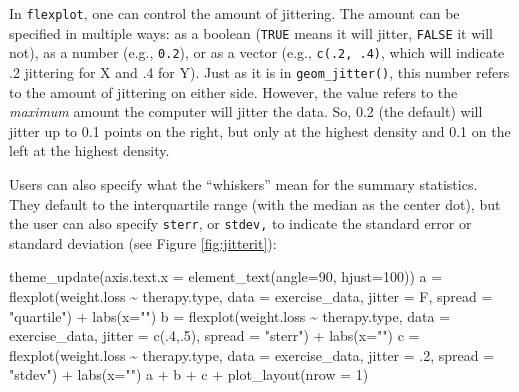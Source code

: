 \documentclass[
  english,
  man]{apa6}
\newenvironment{Shaded}{\begin{snugshade}}{\end{snugshade}}
\newcommand{\AttributeTok}[1]{\textcolor[rgb]{0.77,0.63,0.00}{#1}}
\newcommand{\DecValTok}[1]{\textcolor[rgb]{0.00,0.00,0.81}{#1}}
\newcommand{\FunctionTok}[1]{\textcolor[rgb]{0.00,0.00,0.00}{#1}}
\newcommand{\NormalTok}[1]{#1}
\newcommand{\OtherTok}[1]{\textcolor[rgb]{0.56,0.35,0.01}{#1}}
\newcommand{\SpecialCharTok}[1]{\textcolor[rgb]{0.00,0.00,0.00}{#1}}
\newcommand{\StringTok}[1]{\textcolor[rgb]{0.31,0.60,0.02}{#1}}
\begin{document}
\normalsize

In \texttt{flexplot}, one can control the amount of jittering. The amount can be specified in multiple ways: as a boolean (\texttt{TRUE} means it will jitter, \texttt{FALSE} it will not), as a number (e.g., \texttt{0.2}), or as a vector (e.g., \texttt{c(.2,\ .4)}, which will indicate .2 jittering for X and .4 for Y). Just as it is in \texttt{geom\_jitter()}, this number refers to the amount of jittering on either side. However, the value refers to the \emph{maximum} amount the computer will jitter the data. So, 0.2 (the default) will jitter up to 0.1 points on the right, but only at the highest density and 0.1 on the left at the highest density.

Users can also specify what the ``whiskers'' mean for the summary statistics. They default to the interquartile range (with the median as the center dot), but the user can also specify \texttt{sterr}, or \texttt{stdev,} to indicate the standard error or standard deviation (see Figure \ref{fig:jitterit}):

\small

\begin{Shaded}
\begin{Highlighting}[]
\FunctionTok{theme\_update}\NormalTok{(}\AttributeTok{axis.text.x =} \FunctionTok{element\_text}\NormalTok{(}\AttributeTok{angle=}\DecValTok{90}\NormalTok{, }\AttributeTok{hjust=}\DecValTok{100}\NormalTok{))}
\NormalTok{a }\OtherTok{=} \FunctionTok{flexplot}\NormalTok{(weight.loss }\SpecialCharTok{\textasciitilde{}}\NormalTok{ therapy.type, }\AttributeTok{data =}\NormalTok{ exercise\_data, }
              \AttributeTok{jitter =}\NormalTok{ F, }\AttributeTok{spread =} \StringTok{"quartile"}\NormalTok{) }\SpecialCharTok{+}
              \FunctionTok{labs}\NormalTok{(}\AttributeTok{x=}\StringTok{""}\NormalTok{) }
\NormalTok{b }\OtherTok{=} \FunctionTok{flexplot}\NormalTok{(weight.loss }\SpecialCharTok{\textasciitilde{}}\NormalTok{ therapy.type, }\AttributeTok{data =}\NormalTok{ exercise\_data, }
              \AttributeTok{jitter =} \FunctionTok{c}\NormalTok{(.}\DecValTok{4}\NormalTok{,.}\DecValTok{5}\NormalTok{), }\AttributeTok{spread =} \StringTok{"sterr"}\NormalTok{) }\SpecialCharTok{+}
              \FunctionTok{labs}\NormalTok{(}\AttributeTok{x=}\StringTok{""}\NormalTok{)}
\NormalTok{c }\OtherTok{=} \FunctionTok{flexplot}\NormalTok{(weight.loss }\SpecialCharTok{\textasciitilde{}}\NormalTok{ therapy.type, }\AttributeTok{data =}\NormalTok{ exercise\_data, }
              \AttributeTok{jitter =}\NormalTok{ .}\DecValTok{2}\NormalTok{, }\AttributeTok{spread =} \StringTok{"stdev"}\NormalTok{) }\SpecialCharTok{+} 
              \FunctionTok{labs}\NormalTok{(}\AttributeTok{x=}\StringTok{""}\NormalTok{)}
\NormalTok{a }\SpecialCharTok{+}\NormalTok{ b }\SpecialCharTok{+}\NormalTok{ c }\SpecialCharTok{+} \FunctionTok{plot\_layout}\NormalTok{(}\AttributeTok{nrow =} \DecValTok{1}\NormalTok{)}
\end{Highlighting}
\end{Shaded}
\end{document}
